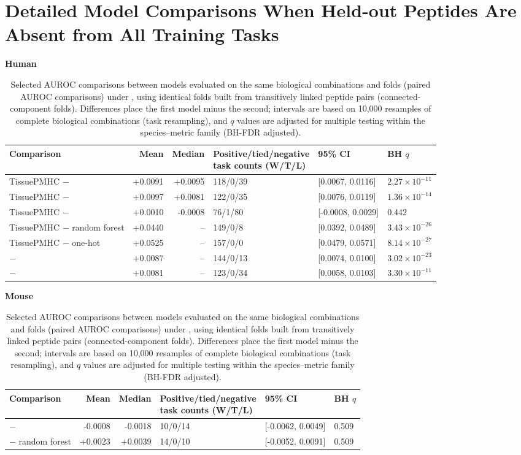 \section{Detailed Model Comparisons When Held-out Peptides Are Absent from All Training Tasks}

\begin{table}[htbp]
\centering
\caption{Selected AUROC comparisons between models evaluated on the same biological combinations and folds (paired AUROC comparisons) under \plainPeptideOOF{}, using identical folds built from transitively linked peptide pairs (connected-component folds). Differences place the first model minus the second; intervals are based on 10,000 resamples of complete biological combinations (task resampling), and \(q\) values are adjusted for multiple testing within the species--metric family (BH-FDR adjusted).}
\label{tab:appendix-strict-paired}
\scriptsize
\setlength{\tabcolsep}{0.8pt}
\textbf{Human}\par\smallskip
\begin{tabularx}{\textwidth}{@{}>{\raggedright\arraybackslash}Xrrlll@{}}
\toprule
Comparison & Mean & Median & \shortstack{Positive/tied/negative\\task counts (W/T/L)} & 95\% CI & BH \(q\) \\
\midrule
TissuePMHC $-$ \plainSharedHeads{} & +0.0091 & +0.0095 & 118/0/39 & [0.0067, 0.0116] & $2.27\times10^{-11}$ \\
TissuePMHC $-$ \plainPlainDual{} & +0.0097 & +0.0081 & 122/0/35 & [0.0076, 0.0119] & $1.36\times10^{-14}$ \\
TissuePMHC $-$ \plainAuxDual{} & +0.0010 & -0.0008 & 76/1/80 & [-0.0008, 0.0029] & 0.442 \\
TissuePMHC $-$ \plainBLOSUM{} random forest & +0.0440 & -- & 149/0/8 & [0.0392, 0.0489] & $3.43\times10^{-26}$ \\
TissuePMHC $-$ one-hot & +0.0525 & -- & 157/0/0 & [0.0479, 0.0571] & $8.14\times10^{-27}$ \\
\plainAuxDual{} $-$ \plainPlainDual{} & +0.0087 & -- & 144/0/13 & [0.0074, 0.0100] & $3.02\times10^{-23}$ \\
\plainAuxDual{} $-$ \plainSharedHeads{} & +0.0081 & -- & 123/0/34 & [0.0058, 0.0103] & $3.30\times10^{-11}$ \\
\bottomrule
\end{tabularx}
\par\medskip
\textbf{Mouse}\par\smallskip
\begin{tabularx}{\textwidth}{@{}>{\raggedright\arraybackslash}Xrrlll@{}}
\toprule
Comparison & Mean & Median & \shortstack{Positive/tied/negative\\task counts (W/T/L)} & 95\% CI & BH \(q\) \\
\midrule
\plainMMoE{} $-$ \plainSharedHeads{} & -0.0008 & -0.0018 & 10/0/14 & [-0.0062, 0.0049] & 0.509 \\
\plainMMoE{} $-$ \plainBLOSUM{} random forest & +0.0023 & +0.0039 & 14/0/10 & [-0.0052, 0.0091] & 0.509 \\
\bottomrule
\end{tabularx}
\end{table}

